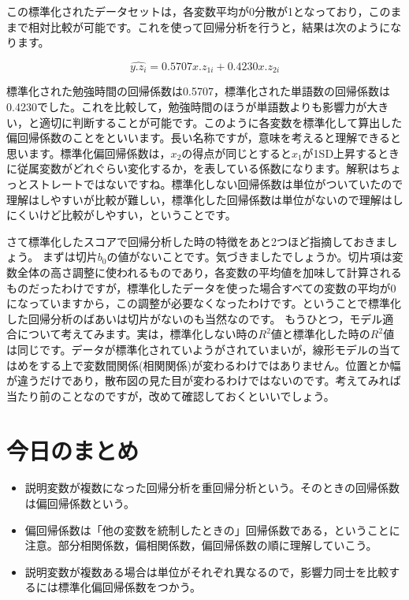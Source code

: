 \documentclass{ltjbook}
\begin{document}
この標準化されたデータセットは，各変数平均が0分散が1となっており，このままで相対比較が可能です。これを使って回帰分析を行うと，結果は次のようになります。

\[ \hat{y.z_i} = 0.5707 x.z_{1i} + 0.4230 x.z_{2i} \]

標準化された勉強時間の回帰係数は0.5707，標準化された単語数の回帰係数は0.4230でした。これを比較して，勉強時間のほうが単語数よりも影響力が大きい，と適切に判断することが可能です。このように各変数を標準化して算出した偏回帰係数のことをといいます。長い名称ですが，意味を考えると理解できると思います。標準化偏回帰係数は，$x_2$の得点が同じとすると$x_1$が1SD上昇するときに従属変数がどれぐらい変化するか，を表している係数になります。解釈はちょっとストレートではないですね。標準化しない回帰係数は単位がついていたので理解はしやすいが比較が難しい，標準化した回帰係数は単位がないので理解はしにくいけど比較がしやすい，ということです。

さて標準化したスコアで回帰分析した時の特徴をあと2つほど指摘しておきましょう。
まずは切片$b_0$の値がないことです。気づきましたでしょうか。切片項は変数全体の高さ調整に使われるものであり，各変数の平均値を加味して計算されるものだったわけですが，標準化したデータを使った場合すべての変数の平均が0になっていますから，この調整が必要なくなったわけです。ということで標準化した回帰分析のばあいは切片がないのも当然なのです。
もうひとつ，モデル適合について考えてみます。実は，標準化しない時の$R^2$値と標準化した時の$R^2$値は同じです。データが標準化されていようがされていまいが，線形モデルの当てはめをする上で変数間関係(相関関係)が変わるわけではありません。位置とか幅が違うだけであり，散布図の見た目が変わるわけではないのです。考えてみれば当たり前のことなのですが，改めて確認しておくといいでしょう。


\section{今日のまとめ}
\begin{itemize}
	\item 説明変数が複数になった回帰分析を重回帰分析という。そのときの回帰係数は偏回帰係数という。
	\item 偏回帰係数は「他の変数を統制したときの」回帰係数である，ということに注意。部分相関係数，偏相関係数，偏回帰係数の順に理解していこう。
	\item 説明変数が複数ある場合は単位がそれぞれ異なるので，影響力同士を比較するには標準化偏回帰係数をつかう。
\end{itemize}
\end{document}
